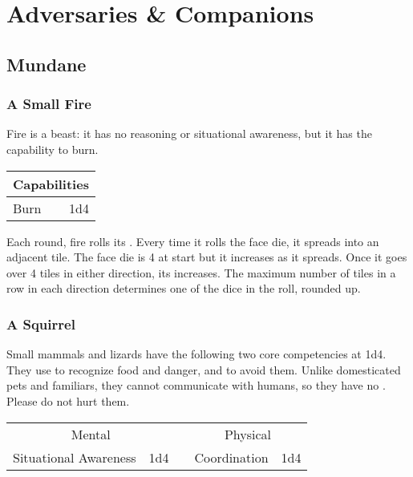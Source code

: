 \documentclass{LegrandOrangeTufteBook}
\begin{document}
\chapterspaceabove{6.75cm}
\chapterspacebelow{11.25cm}


\chapter*{Adversaries \& Companions}

\section*{Mundane}

\subsection*{A Small Fire}

Fire is a beast: it has no reasoning or situational awareness, but it has the capability to burn.
\begin{center}
	\begin{tabular}{lr|}
		\multicolumn{2}{c}{Capabilities}\\
		\hline
		Burn & 1d4 \\
	\end{tabular}
\end{center}

Each round, fire rolls its . Every time it rolls the face die,
it spreads into an adjacent tile. The face die is 4 at start but it increases as it spreads.
Once it goes over 4 tiles in either direction, its  increases.
The maximum number of tiles in a row in each direction determines one of the dice in the  roll, rounded up.
\\



\subsection*{A Squirrel}
Small mammals and lizards have the following two core competencies at 1d4.
They use  to recognize food and danger,
and  to avoid them.
Unlike domesticated pets and familiars, they cannot communicate with
humans, so they have no .
Please do not hurt them.\\
\begin{center}
	\begin{tabular}{lr|clr|}
		\multicolumn{2}{c}{Mental}	&&	\multicolumn{2}{c}{Physical} \\
		\cline{1-2} \cline{4-5}
		Situational Awareness & 1d4				&& 	Coordination & 1d4 \\
	\end{tabular}
\end{center}
\end{document}
